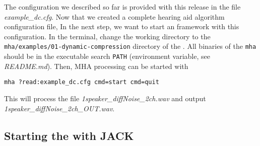 The configuration we described so far is provided with this release 
in the file \emph{example\_dc.cfg}.
Now that we created a complete \mha{} hearing aid
algorithm configuration file, In the next step, we want to start an \mha{}
framework with this configuration.
%
In the terminal, change the working directory to the
\verb!mha/examples/01-dynamic-compression! 
directory of the \mha{}.
All binaries of the \verb!mha! should be in the executable search
\verb!PATH! (environment variable, see \emph{README.md}).
Then, MHA processing can be started with
\begin{verbatim}
mha ?read:example_dc.cfg cmd=start cmd=quit
\end{verbatim}
%
This will process the file \emph{1speaker\_diffNoise\_2ch.wav} and output 
\emph{1speaker\_diffNoise\_2ch\_OUT.wav}.


\subsection{Starting the \mhad{} with JACK}%
\label{sec:example_jack}%
%
%
%

